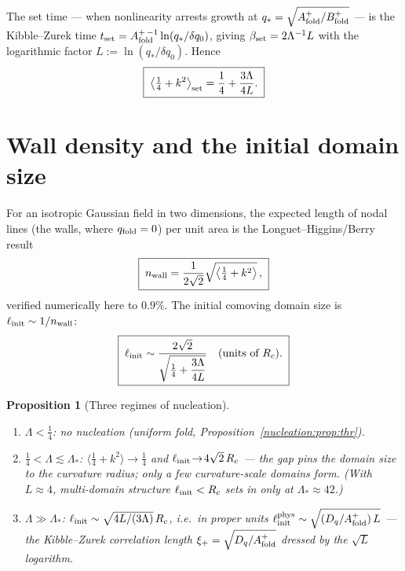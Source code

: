 \documentclass[11pt,a4paper,oneside]{book}
\newcommand{\qf}{q_{\rm fold}}
\newcommand{\Af}{A_{\rm fold}}
\newcommand{\Bf}{B_{\rm fold}}
\newcommand{\Dq}{D_q}
\newcommand{\Lam}{\Lambda}
\newcommand{\Rc}{R_c}
\theoremstyle{plain}
\newtheorem{proposition}{Proposition}[chapter]
\theoremstyle{definition}
\theoremstyle{remark}
\begin{document}
The set time --- when nonlinearity arrests growth at $q_\ast=\sqrt{\Af^+/\Bf^+}$ --- is the
Kibble--Zurek time $t_{\rm set}=\Af^{+\,-1}\ln(q_\ast/\delta q_0)$, giving
$\beta_{\rm set}=2\Lam^{-1}L$ with the logarithmic factor $L:=\ln(q_\ast/\delta q_0)$. Hence
\begin{equation}
\boxed{\;\bigl\langle\tfrac14+k^2\bigr\rangle_{\rm set}=\frac14+\frac{3\Lam}{4L}.\;}
\end{equation}

\section{Wall density and the initial domain size}

For an isotropic Gaussian field in two dimensions, the expected length of nodal lines (the walls, where
$\qf=0$) per unit area is the Longuet--Higgins/Berry result
\begin{equation}
\boxed{\;n_{\rm wall}=\frac{1}{2\sqrt2}\sqrt{\bigl\langle\tfrac14+k^2\bigr\rangle}\,,\;}
\end{equation}
verified numerically here to $0.9\%$. The initial comoving domain size is $\ell_{\rm init}\sim
1/n_{\rm wall}$:
\begin{equation}
\boxed{\;\ell_{\rm init}\sim\frac{2\sqrt2}{\sqrt{\tfrac14+\dfrac{3\Lam}{4L}}}\quad(\text{units of }\Rc).\;}
\end{equation}

\begin{proposition}[Three regimes of nucleation]\label{nucleation:prop:regimes}
\leavevmode
\begin{enumerate}[label=(\roman*),leftmargin=1.8em,itemsep=2pt]
\item $\Lam<\tfrac14$: no nucleation (uniform fold, Proposition~\ref{nucleation:prop:thr}).
\item $\tfrac14<\Lam\lesssim\Lam_\ast$: $\langle\tfrac14+k^2\rangle\!\to\!\tfrac14$ and
$\ell_{\rm init}\!\to\!4\sqrt2\,\Rc$ --- the gap pins the domain size to the curvature radius; only a few
curvature-scale domains form. (With $L\!\approx\!4$, multi-domain structure $\ell_{\rm init}<\Rc$ sets in
only at $\Lam_\ast\approx42$.)
\item $\Lam\gg\Lam_\ast$: $\ell_{\rm init}\sim\sqrt{4L/(3\Lam)}\,\Rc$, i.e.\ in proper units
$\ell_{\rm init}^{\rm phys}\sim\sqrt{(\Dq/\Af^+)\,L}$ --- the Kibble--Zurek correlation length
$\xi_+=\sqrt{\Dq/\Af^+}$ dressed by the $\sqrt{L}$ logarithm.
\end{enumerate}
\end{proposition}
\end{document}
